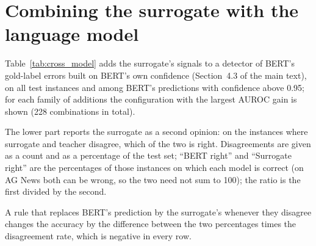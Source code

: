 \documentclass[review,12pt]{elsarticle}
\begin{document}
\begin{table}[H]
\centering
\scriptsize
\setlength{\tabcolsep}{4pt}
\caption{Gradient-boosting detector (gold-label errors, 10-fold cross-validation) on the same features as the logistic detector: AUROC on the confidence alone and on confidence plus explanation, and paired-bootstrap gains in AUROC and AUPRC with 95\% intervals.}
\label{tab:gbm}
\end{table}

\section{Combining the surrogate with the language model}

Table~\ref{tab:cross_model} adds the surrogate's signals to a detector of BERT's gold-label errors built on BERT's own confidence (Section~4.3 of the main text), on all test instances and among BERT's predictions with confidence above 0.95; for each family of additions the configuration with the largest AUROC gain is shown (228 combinations in total).

The lower part reports the surrogate as a second opinion: on the instances where surrogate and teacher disagree, which of the two is right. Disagreements are given as a count and as a percentage of the test set; ``BERT right'' and ``Surrogate right'' are the percentages of those instances on which each model is correct (on AG News both can be wrong, so the two need not sum to 100); the ratio is the first divided by the second.

A rule that replaces BERT's prediction by the surrogate's whenever they disagree changes the accuracy by the difference between the two percentages times the disagreement rate, which is negative in every row.
\end{document}

